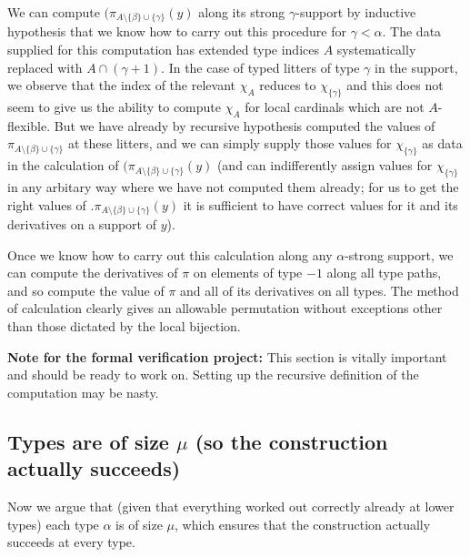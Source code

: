 \documentclass[112pt]{article}
\begin{document}
\begin{description}
We can compute $(\pi_{A \setminus \{\beta\} \cup \{\gamma\}}(y)$ along its strong $\gamma$-support by inductive hypothesis that we know how to carry out this procedure for $\gamma<\alpha$.  The data supplied for this computation has extended type indices $A$ systematically replaced with
$A \cap (\gamma+1)$.  In the case of typed litters of type $\gamma$ in the support, we observe that the index of the relevant $\chi_A$ reduces
to $\chi_{\{\gamma\}}$ and this does not seem to give us the ability to compute $\chi_A$ for local cardinals which are not $A$-flexible.  But we have
already by recursive hypothesis computed the values of $\pi_{A \setminus \{\beta\} \cup \{\gamma\}}$ at these litters, and we can simply supply those values for $\chi_{\{\gamma\}}$ as data in the calculation of $(\pi_{A \setminus \{\beta\} \cup \{\gamma\}}(y)$ (and can indifferently assign values
for $\chi_{\{\gamma\}}$ in any arbitary way where we have not computed them already;  for us to get the right values of .$\pi_{A \setminus \{\beta\} \cup \{\gamma\}}(y)$ it is sufficient to have correct values for it and its derivatives on a support of $y$).

Once we know how to carry out this calculation along any $\alpha$-strong support, we can compute the derivatives of $\pi$ on elements of type $-1$  along all type paths, and so compute the value of $\pi$ and all of its derivatives on all types.  The method of calculation clearly gives an allowable permutation without exceptions other than those dictated by the local bijection.

\end{description}
{\bf Note for the formal verification project:}  This section is vitally important and should be ready to work on.  Setting up the recursive definition of the computation may be nasty.

\newpage
\subsection{Types are of size $\mu$ (so the construction actually succeeds)}

Now we argue that (given that everything worked out correctly already at lower types) each type $\alpha$ is of size $\mu$, which ensures
that the construction actually succeeds at every type.
\end{document}
